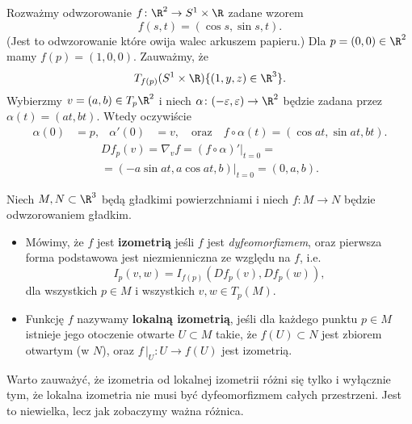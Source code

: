 \begin{frame}

\begin{przyklad}\label{ex:differential}
Rozważmy odwzorowanie $f\colon \R^2\to S^1\times \R$ zadane wzorem \[f(s,t)=(\cos s,\sin s,t).\]
(Jest to odwzorowanie które owija walec arkuszem papieru.) \pause Dla $p=(0,0)\in \R^2$ mamy $f(p)=(1,0,0)$. Zauważmy, że \[T_{f(p)}(S^1 \times \R)\{(1,y,z)\in \R^3 \}.\]
\pause Wybierzmy $v=(a,b)\in T_p\R^2$ i niech $\alpha\colon (-\varepsilon,\varepsilon)\to\R^2$ będzie zadana przez $\alpha(t)=(at,bt)$. Wtedy oczywiście
\begin{align*}
\alpha(0)&=p, &
\alpha'(0)&=v, \quad\text{oraz}\quad
f\circ \alpha (t)=(\cos at,\sin at, bt).
\end{align*}\pause
\begin{multline*}
Df_p(v)=\nabla_v f=(f\circ \alpha)'\big|_{t=0}=\\=(-a\sin at,a\cos at, b)\big|_{t=0}=(0,a,b).
\end{multline*}
\end{przyklad}

\end{frame}
\begin{frame}[<+->]

\begin{definicja}
Niech $M,N\subset \R^3$ będą gładkimi powierzchniami i niech $f\colon M\to N$ będzie odwzorowaniem gładkim.
\begin{itemize}
\item Mówimy, że $f$ jest \textbf{izometrią} jeśli $f$ jest \emph{dyfeomorfizmem}, oraz pierwsza forma podstawowa jest niezmienniczna ze względu na $f$, i.e. \[I_p(v,w)=I_{f(p)}(Df_p(v),Df_p(w)),\] dla wszystkich $p\in M$ i wszystkich $v,w\in T_p(M)$.

\item Funkcję $f$ nazywamy \textbf{lokalną izometrią}, jeśli dla każdego punktu $p\in M$ istnieje jego otoczenie otwarte $U\subset M$ takie, że $f(U)\subset N$ jest zbiorem otwartym (w $N$), oraz $f\,\big|_U\colon U\to f(U)$ jest izometrią.
\end{itemize}

\end{definicja}
\end{frame}
\begin{frame}[<+->]


\begin{uwaga}

Warto zauważyć, że izometria od lokalnej izometrii różni się tylko i wyłącznie tym, że lokalna izometria nie musi być dyfeomorfizmem całych przestrzeni. Jest to niewielka, lecz jak zobaczymy ważna różnica.

\end{uwaga}

\end{frame}
